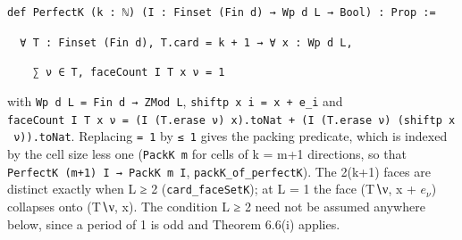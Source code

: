 \documentclass[11pt,a4paper]{article}
\theoremstyle{named}
\begin{document}
\begin{leancode}
\item \texttt{def\ \allowbreak{}PerfectK\ \allowbreak{}(k\ \allowbreak{}:\ \allowbreak{}ℕ)\ \allowbreak{}(I\ \allowbreak{}:\ \allowbreak{}Finset\ \allowbreak{}(Fin\ \allowbreak{}d)\ \allowbreak{}→\ \allowbreak{}Wp\ \allowbreak{}d\ \allowbreak{}L\ \allowbreak{}→\ \allowbreak{}Bool)\ \allowbreak{}:\ \allowbreak{}Prop\ \allowbreak{}:=}
\item \texttt{\ \allowbreak{}\ \allowbreak{}∀\ \allowbreak{}T\ \allowbreak{}:\ \allowbreak{}Finset\ \allowbreak{}(Fin\ \allowbreak{}d),\ \allowbreak{}T.\allowbreak{}card\ \allowbreak{}=\ \allowbreak{}k\ \allowbreak{}+\ \allowbreak{}1\ \allowbreak{}→\ \allowbreak{}∀\ \allowbreak{}x\ \allowbreak{}:\ \allowbreak{}Wp\ \allowbreak{}d\ \allowbreak{}L,}
\item \texttt{\ \allowbreak{}\ \allowbreak{}\ \allowbreak{}\ \allowbreak{}∑\ \allowbreak{}ν\ \allowbreak{}∈\ \allowbreak{}T,\ \allowbreak{}faceCount\ \allowbreak{}I\ \allowbreak{}T\ \allowbreak{}x\ \allowbreak{}ν\ \allowbreak{}=\ \allowbreak{}1}
\end{leancode}
with \texttt{Wp\ \allowbreak{}d\ \allowbreak{}L\ \allowbreak{}=\ \allowbreak{}Fin\ \allowbreak{}d\ \allowbreak{}→\ \allowbreak{}ZMod\ \allowbreak{}L}, \texttt{shiftp\ \allowbreak{}x\ \allowbreak{}i\ \allowbreak{}=\ \allowbreak{}x\ \allowbreak{}+\ \allowbreak{}e\_\allowbreak{}i} and \texttt{faceCount\ \allowbreak{}I\ \allowbreak{}T\ \allowbreak{}x\ \allowbreak{}ν\ \allowbreak{}=\ \allowbreak{}(I\ \allowbreak{}(T.\allowbreak{}erase\ \allowbreak{}ν)\ \allowbreak{}x).\allowbreak{}toNat\ \allowbreak{}+\ \allowbreak{}(I\ \allowbreak{}(T.\allowbreak{}erase\ \allowbreak{}ν)\ \allowbreak{}(shiftp\ \allowbreak{}x\ \allowbreak{}ν)).\allowbreak{}toNat}. Replacing \texttt{=\ \allowbreak{}1} by \texttt{≤\ \allowbreak{}1} gives the packing predicate, which is indexed by the cell size less one (\texttt{PackK\ \allowbreak{}m} for cells of k = m+1 directions, so that \texttt{PerfectK\ \allowbreak{}(m+1)\ \allowbreak{}I\ \allowbreak{}→\ \allowbreak{}PackK\ \allowbreak{}m\ \allowbreak{}I}, \texttt{packK\_\allowbreak{}of\_\allowbreak{}perfectK}). The 2(k+1) faces are distinct exactly when L ≥ 2 (\texttt{card\_\allowbreak{}faceSetK}); at L = 1 the face (T∖ν, x + $e_{ν}$) collapses onto (T∖ν, x). The condition L ≥ 2 need not be assumed anywhere below, since a period of 1 is odd and Theorem 6.6(i) applies.
\end{document}
